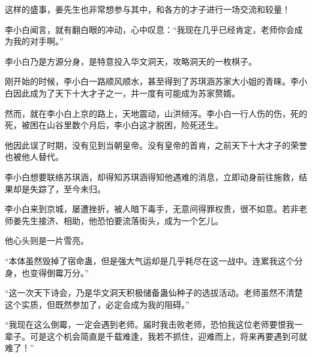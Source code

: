 \begin{this_body}
这样的盛事，姜先生也非常想参与其中，和各方的才子进行一场交流和较量！

李小白闻言，就有翻白眼的冲动，心中叹息：“我现在几乎已经肯定，老师你会成为我的对手啊。”

李小白乃是方源分身，是特意投入华文洞天，攻略洞天的一枚棋子。

刚开始的时候，李小白一路顺风顺水，甚至得到了苏琪涵苏家大小姐的青睐。李小白因此成为了天下十大才子之一，并一度有可能成为苏家赘婿。

然而，就在李小白上京的路上，天地震动，山洪倾泻。李小白一行人伤的伤，死的死，被困在山谷里数个月后，李小白这才脱困，险死还生。

他因此误了时期，没有见到当朝皇帝。没有皇帝的首肯，之前天下十大才子的荣誉也被他人替代。

李小白想要联络苏琪涵，却得知苏琪涵得知他遇难的消息，立即动身前往施救，结果却是失踪了，至今未归。

李小白来到京城，屡遭挫折，被人暗下毒手，无意间得罪权贵，很不如意。若非老师姜先生接济、相助，他恐怕要流落街头，成为一个乞儿。

他心头则是一片雪亮。

“本体虽然毁掉了宿命蛊，但是强大气运却是几乎耗尽在这一战中。连累我这个分身，也变得倒霉万分。”

“这一次天下诗会，乃是华文洞天积极储备蛊仙种子的选拔活动。老师虽然不清楚这个实质，但既然参加了，必定会成为我的阻碍。”

“我现在这么倒霉，一定会遇到老师。届时我击败老师，恐怕我这位老师要恨我一辈子。可是这个机会简直是千载难逢，我若不抓住，迎难而上，将来再要遇到可就难了！”

\end{this_body}

